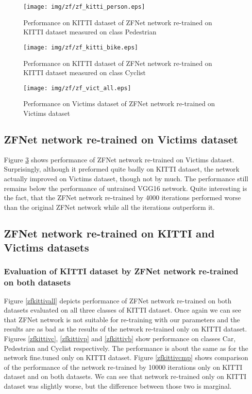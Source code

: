 \begin{figure}[!]
\texttt{[image: img/zf/zf\_kitti\_person.eps]}
\caption[Performance of ZFNet network on KITTI dataset, class Pedestrian]{Performance on KITTI dataset of ZFNet network re-trained on KITTI dataset measured on class Pedestrian}
\label{zfkittip}
\end{figure}

\begin{figure}[!]
\texttt{[image: img/zf/zf\_kitti\_bike.eps]}
\caption[Performance of ZFNet network on KITTI dataset, class Cyclist]{Performance on KITTI dataset of ZFNet network re-trained on KITTI dataset measured on class Cyclist}
\label{zfkittib}
\end{figure}

\begin{figure}[!]
\texttt{[image: img/zf/zf\_vict\_all.eps]}
\caption[Performance of ZFNet network on Victims dataset]{Performance on Victims dataset of ZFNet network re-trained on Victims dataset}
\label{zfvictall}
\end{figure}

\subsection{ZFNet network re-trained on Victims dataset}
Figure \ref{zfvictall} shows performance of ZFNet network re-trained on Victims dataset. Surprisingly, although it preformed quite badly on KITTI dataset, the network actually improved on Victims dataset, though not by much. The performance still remains below the performance of untrained VGG16 network. Quite interesting is the fact, that the ZFNet network re-trained by 4000 iterations performed worse than the original ZFNet network while all the iterations outperform it.

\subsection{ZFNet network re-trained on KITTI and Victims datasets}
\subsubsection{Evaluation of KITTI dataset by ZFNet network re-trained on both datasets}
Figure \ref{zfkittivall} depicts performance of ZFNet network re-trained on both datasets evaluated on all three classes of KITTI dataset. Once again we can see that ZFNet network is not suitable for re-training with our parameters and the results are as bad as the results of the network re-trained only on KITTI dataset. Figures \ref{zfkittivc}, \ref{zfkittivp} and \ref{zfkittivb} show performance on classes Car, Pedestrian and Cyclist respectively. The performance is about the same as for the network fine.tuned only on KITTI dataset. Figure \ref{zfkittivcmp} shows comparison of the performance of the network re-trained by 10000 iterations only on KITTI dataset and on both datasets. We can see that network re-trained only on KITTI dataset was slightly worse, but the difference between those two is marginal.

